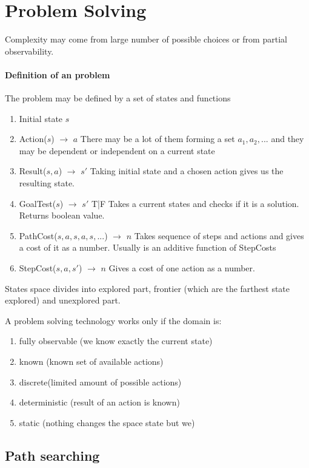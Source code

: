 \documentclass[a4paper,10pt]{article}
\begin{document}
\section{Problem Solving}

Complexity may come from large number of possible choices or from partial observability.

\paragraph{Definition of an problem}
The problem may be defined by a set of states and functions
\begin{enumerate}
  \item Initial state $s$
  \item Action($s$) $\rightarrow$ $a$ There may be a lot of them forming a set ${a_1, a_2, ...}$ and they may be dependent or independent on a current state
  \item Result($s,a$) $\rightarrow$ $s'$ Taking initial state and a chosen action gives us the resulting state.
  \item GoalTest($s$) $\rightarrow$ $s'$ T|F Takes a current states and checks if it is a solution. Returns boolean value.
  \item PathCost($s,a,s,a,s,...$) $\rightarrow$ $n$ Takes sequence of steps and actions and gives a cost of it as a number. Usually is an additive function of StepCosts
  \item StepCost($s,a,s'$) $\rightarrow$ $n$ Gives a cost of one action as a number.
\end{enumerate}

States space divides into explored part, frontier (which are the farthest state explored) and unexplored part.

A problem solving technology works only if the domain is:
\begin{enumerate}
 \item fully observable (we know exactly the current state)
 \item known (known set of available actions)
 \item discrete(limited amount of possible actions)
 \item deterministic (result of an action is known)
 \item static (nothing changes the space state but we)
\end{enumerate}

\subsection{Path searching}
\end{document}
